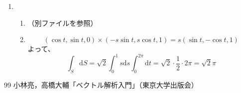 \documentclass{jarticle}
\def\d{\mathrm d}
\begin{document}
\begin{enumerate}
\begin{enumerate}
      \item
        \[ | (1,0,y) \times (0,1,x) | = | (-y,-x,1) | = \sqrt{1+x^2+y^2} \]
        より、
        \begin{eqnarray*} 
          \int_0^1 \d x \int_0^1 \d y xy \sqrt{1+x^2+y^2} & = & \int_0^1 \d x \left[ \frac{1}{3} x (1+x^2+y^2)^\frac{3}{2} \right]_0^1 \\
          & = & \int_0^1 \d x \frac{1}{3} x \left{ (2+x^2)^{\frac{3}{2}} - (1+x^2)^{\frac{3}{2}} \right} \\
          & = & \frac{1}{3} \left[ \frac{1}{5} (2+x^2)^\frac{5}{2} - \frac{1}{5} (1+x^2)^\frac{5}{2} \right]_0^1 \\
          & = & \frac{1}{3} \left( \frac{1}{5} 3^\frac{5}{2} - \frac{1}{5} 2^\frac{5}{2} - \frac{1}{5} 2^\frac{5}{2} + \frac{1}{5} \right) \\
          & = & \frac{1}{15} \left( 3^\frac{5}{2} - 2^\frac{7}{2} + 1 \right)
        \end{eqnarray*}
      \item
    \end{enumerate}
  \item
    \begin{enumerate}
      \item
        （別ファイルを参照）
      \item
        \[ (\cos t,\sin t,0) \times (-s\sin t,s\cos t,1) = s(\sin t,-\cos t, 1) \]
        よって、
        \[ \int_S \d S = \sqrt{2} \int_0^1 s \d s \int_0^{2\pi} \d t = \sqrt{2} \cdot \frac{1}{2} \cdot 2\pi = \sqrt{2} \pi\]
    \end{enumerate}
\end{enumerate}
  \newpage
\begin{thebibliography}{99}
 小林亮，高橋大輔「ベクトル解析入門」（東京大学出版会）

\end{thebibliography}
\end{document}
